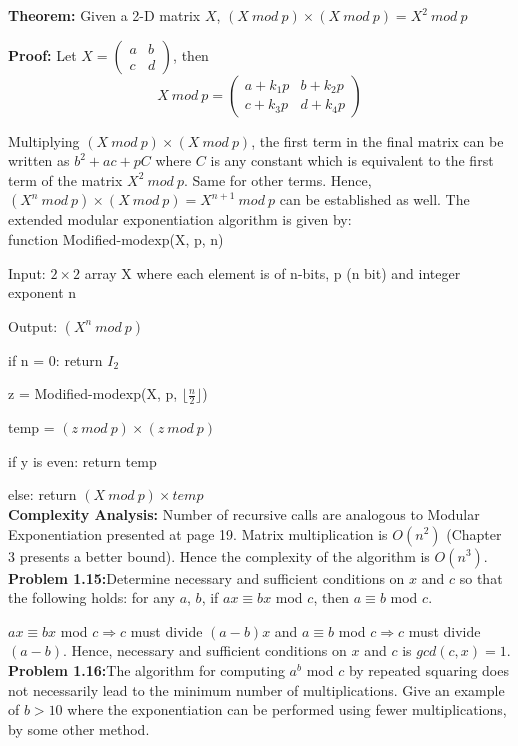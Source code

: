 \documentclass[11pt]{article}
\begin{document}
	\textbf{Theorem:} Given a 2-D matrix $X$, $(X\ mod\ p)\times (X\ mod\ p) = X^2\ mod\ p$
	
	\textbf{Proof:} Let $X = \begin{pmatrix}a & b\\c & d\end{pmatrix}$, then
	$$ X\ mod\ p = \begin{pmatrix}a + k_1p & b + k_2p\\c + k_3p & d + k_4p\end{pmatrix}$$
	
	Multiplying $(X\ mod\ p)\times (X\ mod\ p)$, the first term in the final matrix can be written as $b^2 + ac + pC$ where $C$ is any constant which is equivalent to the first term of the matrix $X^2\ mod\ p$. Same for other terms. Hence, $(X^n\ mod\ p)\times (X\ mod\ p) = X^{n+1}\ mod\ p$ can be established as well. The extended modular exponentiation algorithm is given by:\\
	
	function Modified-modexp(X, p, n)
	
	Input: $2\times2$ array X where each element is of n-bits, p (n bit) and integer exponent n
	
	Output: $(X^n\ mod\ p)$
	
	if n = 0: return $I_2$
	
	z = Modified-modexp(X, p, $\lfloor \frac{n}{2} \rfloor$)
	
	temp = $(z\ mod\ p)\times (z\ mod\ p)$
	
	if y is even: return temp
	
	else: return $(X\ mod\ p)\times temp$\\
	
	\textbf{Complexity Analysis:} Number of recursive calls are analogous to Modular Exponentiation presented at page 19. Matrix multiplication is $O(n^2)$ (Chapter 3 presents a better bound). Hence the complexity of the algorithm is $O(n^3)$.\\
	
	\textbf{Problem 1.15:}Determine necessary and sufficient conditions on $x$ and $c$ so that the following holds: for any $a$, $b$, if $ax \equiv bx$ mod $c$, then $a \equiv b$ mod $c$.
	
	$ax \equiv bx$ mod $c \Rightarrow c$ must divide $(a-b)x$ and $a \equiv b$ mod $c \Rightarrow c$ must divide $(a-b)$. Hence, necessary and sufficient conditions on  $x$ and $c$ is $gcd(c,x) = 1$.\\
	
	\textbf{Problem 1.16:}The algorithm for computing $a^b$ mod $c$ by repeated squaring does not necessarily
	lead to the minimum number of multiplications. Give an example of $b > 10$	where the exponentiation can be performed using fewer multiplications, by some other method.
	
\end{document}

